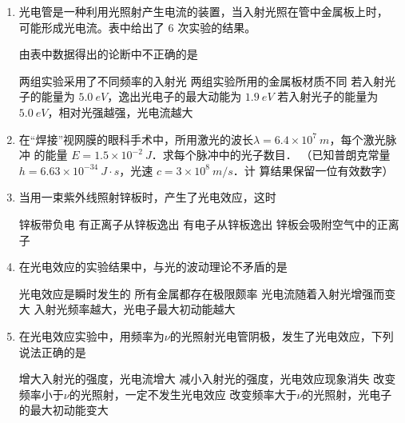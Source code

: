 

\begin{enumerate}
	\item
{}
光电管是一种利用光照射产生电流的装置，当入射光照在管中金属板上时，
可能形成光电流。表中给出了 $ 6 $ 次实验的结果。


 




由表中数据得出的论断中不正确的是  

\fourchoices
{两组实验采用了不同频率的入射光}
{两组实验所用的金属板材质不同}
{若入射光子的能量为 $ 5.0 \ eV $，逸出光电子的最大动能为 $ 1.9 \ eV $}
{若入射光子的能量为 $ 5.0 \ eV $，相对光强越强，光电流越大}


\item 
{}
在“焊接”视网膜的眼科手术中，所用激光的波长$ \lambda =6.4 \times 10^{7} \ m $，每个激光脉冲
的能量 $ E=1.5 \times 10^{-2} \ J $．求每个脉冲中的光子数目．
（已知普朗克常量 $ h=6.63 \times 10 ^{-34} \ J \cdot s $，光速 $ c=3 \times 10^{8} \ m /s $．计
算结果保留一位有效数字）



\item 
{}
当用一束紫外线照射锌板时，产生了光电效应，这时  

\fourchoices
{锌板带负电}
{有正离子从锌板逸出}
{有电子从锌板逸出}
{锌板会吸附空气中的正离子}



\item
{}
在光电效应的实验结果中，与光的波动理论不矛盾的是  


\fourchoices
{光电效应是瞬时发生的}
{所有金属都存在极限颇率}
{光电流随着入射光增强而变大}
{入射光频率越大，光电子最大初动能越大}


\item 
{}
在光电效应实验中，用频率为$ \nu $的光照射光电管阴极，发生了光电效应，下列说法正确的是  


\fourchoices
{增大入射光的强度，光电流增大}
{减小入射光的强度，光电效应现象消失}
{改变频率小于$ \nu $的光照射，一定不发生光电效应}
{改变频率大于$ \nu $的光照射，光电子的最大初动能变大}




\end{enumerate}
